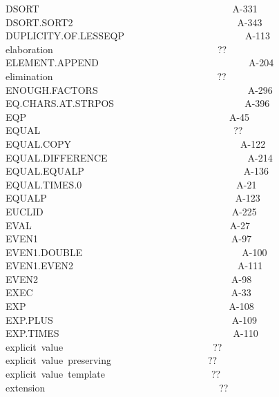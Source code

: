 \documentclass[11pt]{book}
\newenvironment{pubasis}{\begin{flushleft}\ttfamily\small}{\normalsize\rmfamily\end{flushleft}}
\begin{document}
\begin{pubasis}
DSORT~~~~~~~~~~~~~~~~~~~~~~~~~~~~~~~~~~~~~~~~A-331\\
DSORT.SORT2~~~~~~~~~~~~~~~~~~~~~~~~~~~~~~~~~~A-343\\
DU\-PLI\-CI\-TY.OF.LESSEQP~~~~~~~~~~~~~~~~~~~~~~~~~A-113\\
elaboration~~~~~~~~~~~~~~~~~~~~~~~~~~~~~~~~~~??\\
ELEMENT.APPEND~~~~~~~~~~~~~~~~~~~~~~~~~~~~~~~A-204\\
elimination~~~~~~~~~~~~~~~~~~~~~~~~~~~~~~~~~~??\\
ENOUGH.FAC\-TORS~~~~~~~~~~~~~~~~~~~~~~~~~~~~~~~A-296\\
EQ.CHARS.AT.STRPOS~~~~~~~~~~~~~~~~~~~~~~~~~~~A-396\\
EQP~~~~~~~~~~~~~~~~~~~~~~~~~~~~~~~~~~~~~~~~~~A-45\\
EQUAL~~~~~~~~~~~~~~~~~~~~~~~~~~~~~~~~~~~~~~~~??\\
EQUAL.COPY~~~~~~~~~~~~~~~~~~~~~~~~~~~~~~~~~~~A-122\\
EQUAL.DIF\-FER\-ENCE~~~~~~~~~~~~~~~~~~~~~~~~~~~~~A-214\\
EQUAL.EQUALP~~~~~~~~~~~~~~~~~~~~~~~~~~~~~~~~~A-136\\
EQUAL.TIMES.0~~~~~~~~~~~~~~~~~~~~~~~~~~~~~~~~A-21\\
EQUALP~~~~~~~~~~~~~~~~~~~~~~~~~~~~~~~~~~~~~~~A-123\\
EUCLID~~~~~~~~~~~~~~~~~~~~~~~~~~~~~~~~~~~~~~~A-225\\
EVAL~~~~~~~~~~~~~~~~~~~~~~~~~~~~~~~~~~~~~~~~~A-27\\
EVEN1~~~~~~~~~~~~~~~~~~~~~~~~~~~~~~~~~~~~~~~~A-97\\
EVEN1.DOUBLE~~~~~~~~~~~~~~~~~~~~~~~~~~~~~~~~~A-100\\
EVEN1.EVEN2~~~~~~~~~~~~~~~~~~~~~~~~~~~~~~~~~~A-111\\
EVEN2~~~~~~~~~~~~~~~~~~~~~~~~~~~~~~~~~~~~~~~~A-98\\
EXEC~~~~~~~~~~~~~~~~~~~~~~~~~~~~~~~~~~~~~~~~~A-33\\
EXP~~~~~~~~~~~~~~~~~~~~~~~~~~~~~~~~~~~~~~~~~~A-108\\
EXP.PLUS~~~~~~~~~~~~~~~~~~~~~~~~~~~~~~~~~~~~~A-109\\
EXP.TIMES~~~~~~~~~~~~~~~~~~~~~~~~~~~~~~~~~~~~A-110\\
explicit~value~~~~~~~~~~~~~~~~~~~~~~~~~~~~~~~??\\
explicit~value~preserving~~~~~~~~~~~~~~~~~~~~??\\
explicit~value~template~~~~~~~~~~~~~~~~~~~~~~??\\
extension~~~~~~~~~~~~~~~~~~~~~~~~~~~~~~~~~~~~??\\

\end{pubasis}
\end{document}
